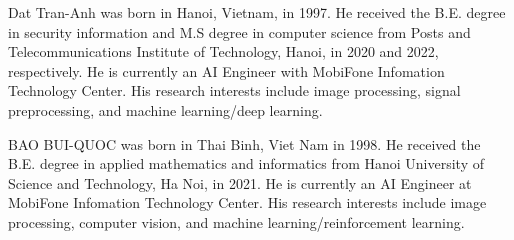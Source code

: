 \documentclass{ieeeaccess}
\begin{document}






% 
% 





% 
\begin{IEEEbiography}{Dat Tran-Anh} was born in Hanoi, Vietnam, in 1997. He received the B.E. degree in security information and M.S degree in computer science from Posts and Telecommunications Institute of Technology, Hanoi, in 2020 and 2022, respectively. He is currently an AI Engineer with MobiFone Infomation Technology Center. His research interests include image processing, signal preprocessing, and machine learning/deep learning.
\end{IEEEbiography}

\begin{IEEEbiography}{BAO BUI-QUOC} was born in Thai Binh, Viet Nam in 
1998. He received the B.E. degree in applied mathematics and informatics from 
Hanoi University of Science and Technology, Ha Noi, in 2021. He is currently an AI Engineer at MobiFone Infomation Technology Center. His research interests include image processing, computer vision, and machine learning/reinforcement learning.
\end{IEEEbiography}
\end{document}
